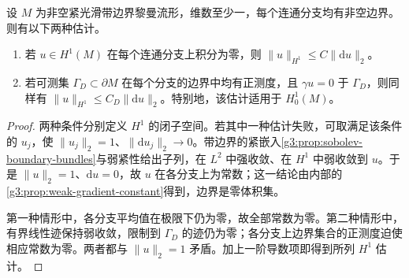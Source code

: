 \begin{lemma}\label{g3:lem:boundary-poincare}
	设 \(M\) 为非空紧光滑带边界黎曼流形，维数至少一，每个连通分支均有非空边界。则有以下两种估计。
	\begin{enumerate}
		\item 若 \(u\in H^1(M)\) 在每个连通分支上积分为零，则 \(\|u\|_{H^1}\le C\|\mathrm du\|_2\)。
		\item 若可测集 \(\Gamma_D\subset\partial M\) 在每个分支的边界中均有正测度，且 \(\gamma u=0\) 于 \(\Gamma_D\)，则同样有 \(\|u\|_{H^1}\le C_D\|\mathrm du\|_2\)。特别地，该估计适用于 \(H_0^1(M)\)。
	\end{enumerate}
\end{lemma}
\begin{proof}
	两种条件分别定义 \(H^1\) 的闭子空间。若其中一种估计失败，可取满足该条件的 \(u_j\)，使 \(\|u_j\|_2=1\)、\(\|\mathrm du_j\|_2\to0\)。带边界的紧嵌入\cref{g3:prop:sobolev-boundary-bundles}与弱紧性给出子列，在 \(L^2\) 中强收敛、在 \(H^1\) 中弱收敛到 \(u\)。于是 \(\|u\|_2=1\)、\(\mathrm du=0\)，故 \(u\) 在各分支上为常数；这一结论由内部的\cref{g3:prop:weak-gradient-constant}得到，边界是零体积集。

	第一种情形中，各分支平均值在极限下仍为零，故全部常数为零。第二种情形中，有界线性迹保持弱收敛，限制到 \(\Gamma_D\) 的迹仍为零；各分支上边界集合的正测度迫使相应常数为零。两者都与 \(\|u\|_2=1\) 矛盾。加上一阶导数项即得到所列 \(H^1\) 估计。
\end{proof}

